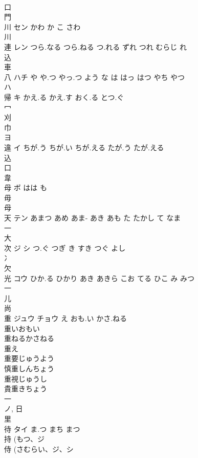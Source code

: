 \documentclass[8pt]{extreport}
\begin{document}
\begin{CJK}{UTF8}{min}
\\	口 
\\	門 
\\	川	セン	かわ か こ さわ	
\\	川 
\\	連	レン	つら.なる つら.ねる つ.れる ずれ つれ むらじ れ	
\\	込 
\\	車 
\\	八	ハチ	や や.つ やっ.つ よう な は はっ はつ やち やつ	
\\	ハ	
\\	帰	キ	かえ.る かえ.す おく.る とつ.ぐ	
\\	冖 
\\	刈 
\\	巾 
\\	ヨ	
\\	違	イ	ちが.う ちが.い ちが.える たが.う たが.える	
\\	込 
\\	口 
\\	韋 
\\	母	ボ	はは も	
\\	毋 
\\	母 
\\	天	テン	あまつ あめ あま- あき あも た たかし て なま	
\\	一 
\\	大 
\\	次	ジ シ	つ.ぐ つぎ き すき つぐ よし	
\\	冫 
\\	欠 
\\	光	コウ	ひか.る ひかり あき あきら こお てる ひこ み みつ	
\\	一 
\\	儿 
\\	尚 
\\	重	ジュウ チョウ	え おも.い かさ.ねる	
\\	重いおもい 
\\	重ねるかさねる 
\\	重え 
\\	重要じゅうよう 
\\	慎重しんちょう 
\\	重視じゅうし 
\\	貴重きちょう 
\\	一 
\\	ノ, 日 
\\	里 
\\	待	タイ	ま.つ まち まつ	
\\	持 (もつ、ジ 
\\	侍 (さむらい、ジ、シ 

\end{CJK}
\end{document}

